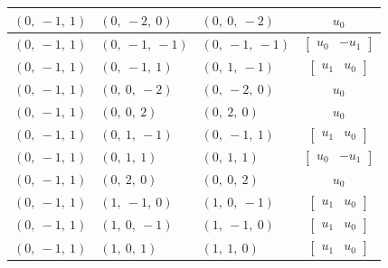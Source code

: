 \documentclass[11pt]{article}
\theoremstyle{definition}
\begin{document}
\begin{longtable}{|l|l|l|c|}
    \hline
    $\left( 0, \  -1, \  1\right)$ & $\left( 0, \  -2, \  0\right)$ & $\left( 0, \  0, \  -2\right)$ & $u_{0}$ \\
    \hline
    $\left( 0, \  -1, \  1\right)$ & $\left( 0, \  -1, \  -1\right)$ & $\left( 0, \  -1, \  -1\right)$ & $\left[\begin{matrix}u_{0} & - u_{1}\end{matrix}\right]$ \\
    \hline
    $\left( 0, \  -1, \  1\right)$ & $\left( 0, \  -1, \  1\right)$ & $\left( 0, \  1, \  -1\right)$ & $\left[\begin{matrix}u_{1} & u_{0}\end{matrix}\right]$ \\
    \hline
    $\left( 0, \  -1, \  1\right)$ & $\left( 0, \  0, \  -2\right)$ & $\left( 0, \  -2, \  0\right)$ & $u_{0}$ \\
    \hline
    $\left( 0, \  -1, \  1\right)$ & $\left( 0, \  0, \  2\right)$ & $\left( 0, \  2, \  0\right)$ & $u_{0}$ \\
    \hline
    $\left( 0, \  -1, \  1\right)$ & $\left( 0, \  1, \  -1\right)$ & $\left( 0, \  -1, \  1\right)$ & $\left[\begin{matrix}u_{1} & u_{0}\end{matrix}\right]$ \\
    \hline
    $\left( 0, \  -1, \  1\right)$ & $\left( 0, \  1, \  1\right)$ & $\left( 0, \  1, \  1\right)$ & $\left[\begin{matrix}u_{0} & - u_{1}\end{matrix}\right]$ \\
    \hline
    $\left( 0, \  -1, \  1\right)$ & $\left( 0, \  2, \  0\right)$ & $\left( 0, \  0, \  2\right)$ & $u_{0}$ \\
    \hline
    $\left( 0, \  -1, \  1\right)$ & $\left( 1, \  -1, \  0\right)$ & $\left( 1, \  0, \  -1\right)$ & $\left[\begin{matrix}u_{1} & u_{0}\end{matrix}\right]$ \\
    \hline
    $\left( 0, \  -1, \  1\right)$ & $\left( 1, \  0, \  -1\right)$ & $\left( 1, \  -1, \  0\right)$ & $\left[\begin{matrix}u_{1} & u_{0}\end{matrix}\right]$ \\
    \hline
    $\left( 0, \  -1, \  1\right)$ & $\left( 1, \  0, \  1\right)$ & $\left( 1, \  1, \  0\right)$ & $\left[\begin{matrix}u_{1} & u_{0}\end{matrix}\right]$ \\

\end{longtable}
\end{document}
